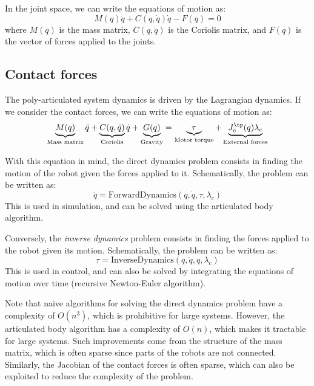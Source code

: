 In the joint space, we can write the equations of motion as:
\begin{equation}
    M(q)\ddot{q} + C(q, \dot{q})\dot{q} - F(q) = 0
\end{equation}
where $M(q)$ is the mass matrix, $C(q, \dot{q})$ is the Coriolis matrix, and $F(q)$ is the vector of forces applied to the joints.

\subsection{Contact forces}
The poly-articulated system dynamics is driven by the Lagrangian dynamics. If we consider the contact forces, we can write the equations of motion as:
\begin{equation*}
    \underbrace{M(q)}_{\text{Mass matrix}}\ddot{q} + \underbrace{C(q, \dot{q})}_{\text{Coriolis}}\dot{q} + \underbrace{G(q)}_{\text{Gravity}} = \underbrace{\tau}_{\text{Motor torque}} + \underbrace{J_c^\tp(q)\lambda_c}_{\text{External forces}}
\end{equation*}

With this equation in mind, the direct dynamics problem consists in finding the motion of the robot given the forces applied to it. Schematically, the problem can be written as:
\begin{equation*}
    \ddot{q} = \text{ForwardDynamics}(q, \dot{q}, \tau, \lambda_c)
\end{equation*}
This is used in simulation, and can be solved using the articulated body algorithm.

Conversely, the \emph{inverse dynamics} problem consists in finding the forces applied to the robot given its motion. Schematically, the problem can be written as:
\begin{equation*}
    \tau = \text{InverseDynamics}(q, \dot{q}, \ddot{q}, \lambda_c)
\end{equation*}
This is used in control, and can also be solved by integrating the equations of motion over time (recursive Newton-Euler algorithm).

Note that naive algorithms for solving the direct dynamics problem have a complexity of $O(n^3)$, which is prohibitive for large systems. However, the articulated body algorithm has a complexity of $O(n)$, which makes it tractable for large systems. Such improvements come from the structure of the mass matrix, which is often sparse since parts of the robots are not connected. Similarly, the Jacobian of the contact forces is often sparse, which can also be exploited to reduce the complexity of the problem.

